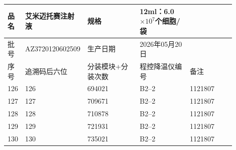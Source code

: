 \documentclass[UTF8,10pt,a4paper,fontset=fandol]{ctexart}
\newcommand{\fieldvalue}[1]{#1}
\begin{document}
\begin{center}
\small
\begin{tabular}{|p{0.07\linewidth}|p{0.18\linewidth}|p{0.23\linewidth}|p{0.22\linewidth}|p{0.20\linewidth}|}
\hline
品名 &
\fieldvalue{艾米迈托赛注射液} &
规格 &
\fieldvalue{12ml：6.0$\times 10^{7}$个细胞/袋} \\
\hline
批号 &
\fieldvalue{AZ3720120602509} &
生产日期 &
\fieldvalue{2026年05月20日} \\
\hline
序号 & 追溯码后六位 & 分装模块+分装次数 & 程控降温仪编号 & 备注 \\
\hline
126 &
\fieldvalue{126} &
\fieldvalue{694021} &
\fieldvalue{B2--2} &
\fieldvalue{1121807} & \\
\hline
127 &
\fieldvalue{127} &
\fieldvalue{709671} &
\fieldvalue{B2--2} &
\fieldvalue{1121807} & \\
\hline
128 &
\fieldvalue{128} &
\fieldvalue{710878} &
\fieldvalue{B2--2} &
\fieldvalue{1121807} & \\
\hline
129 &
\fieldvalue{129} &
\fieldvalue{721931} &
\fieldvalue{B2--2} &
\fieldvalue{1121807} & \\
\hline
130 &
\fieldvalue{130} &
\fieldvalue{735021} &
\fieldvalue{B2--2} &
\fieldvalue{1121807} & \\

\end{tabular}
\end{center}
\end{document}
